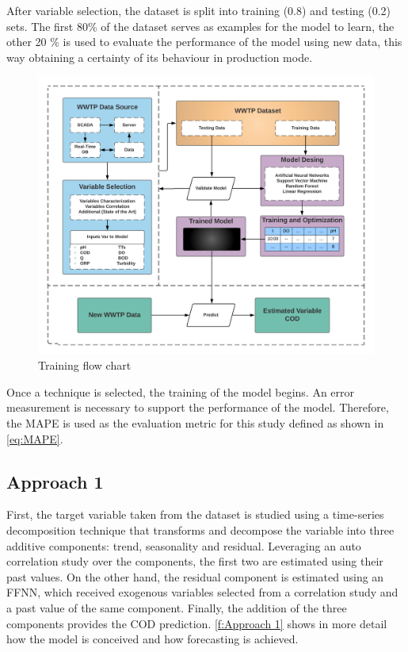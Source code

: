 After variable selection, the dataset is split into training (0.8) and testing (0.2) sets. The first 80\% of the dataset serves as examples for the model to learn, the other 20 \% is used to evaluate the performance of the model using new data, this way obtaining a certainty of its behaviour in production mode. 

\begin{figure}[h]
\centering
\includegraphics[width=\linewidth]{figures/Ch4/training-FlowChart.png}
\caption{Training flow chart}
\label{f:training-flowchart}
\end{figure}

Once a technique is selected, the training of the model begins. An error measurement is necessary to support the performance of the model. Therefore, the \ac{MAPE} is used as the evaluation metric for this study defined as shown in \autoref{eq:MAPE}.


\subsection{Approach 1}
\label{s:Approach1}

First, the target variable taken from the dataset is studied using a time-series decomposition technique that transforms and decompose the variable into three additive components: trend, seasonality and residual. Leveraging an auto correlation study over the components, the first two are estimated using their past values. On the other hand, the residual component is estimated using an \ac{FFNN}, which received exogenous variables selected from a correlation study and a past value of the same component. Finally, the addition of the three components provides the \ac{COD} prediction. \autoref{f:Approach 1} shows in more detail how the model is conceived and how forecasting is achieved.

